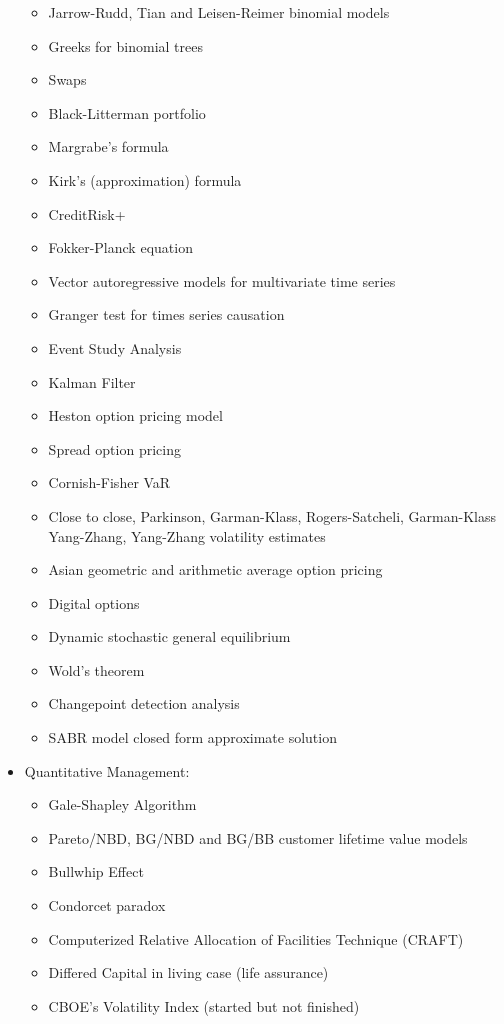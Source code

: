 \begin{itemize}
\begin{itemize}
\begin{itemize}
				\end{itemize}
				\item Jarrow-Rudd, Tian and Leisen-Reimer binomial models
				\item Greeks for binomial trees
				\item Swaps
				\item Black-Litterman portfolio
				\item Margrabe's formula
				\item Kirk's (approximation) formula
				\item CreditRisk+
				\item Fokker-Planck equation
				\item Vector autoregressive models for multivariate time series
				\item Granger test for times series causation
				\item Event Study Analysis
				\item Kalman Filter
				\item Heston option pricing model
				\item Spread option pricing
				\item Cornish-Fisher VaR
				\item Close to close, Parkinson, Garman-Klass, Rogers-Satcheli, Garman-Klass Yang-Zhang, Yang-Zhang volatility estimates
				\item Asian geometric and arithmetic average option pricing
				\item Digital options
				\item Dynamic stochastic general equilibrium
				\item Wold's theorem
				\item Changepoint detection analysis
				\item SABR model closed form approximate solution
			\end{itemize}	
		\item Quantitative Management: 
			\begin{itemize}
				\item Gale-Shapley Algorithm
				\item Pareto/NBD, BG/NBD and BG/BB customer lifetime value models
				\item Bullwhip Effect
				\item Condorcet paradox	
				\item Computerized Relative Allocation of Facilities Technique (CRAFT)
				\item Differed Capital in living case (life assurance)
				\item CBOE's Volatility Index (started but not finished)

\end{itemize}
\end{itemize}
